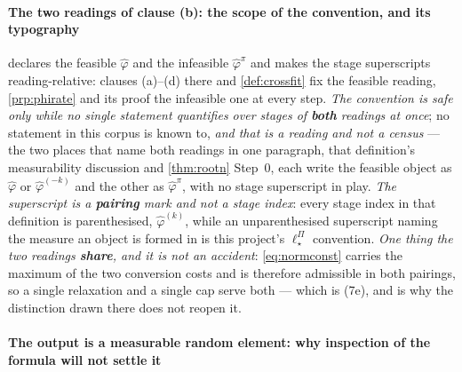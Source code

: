 \paragraph{The two readings of clause \textup{(b)}: the scope of the convention, and its typography}

 declares the feasible $\hat\varphi$ and the infeasible $\hat\varphi^{\pi}$ and makes
the stage superscripts reading-relative: clauses \textup{(a)}--\textup{(d)} there and
\cref{def:crossfit} fix the feasible reading, \cref{prp:phirate} and its proof the infeasible one at
every step. \emph{The convention is safe only while no single statement quantifies over stages of
\textbf{both} readings at once}; no statement in this corpus is known to, \emph{and that is a reading
and not a census} --- the two places that name both readings in one paragraph, that definition's
measurability discussion and \cref{thm:rootn} Step~0, each write the feasible object as $\hat\varphi$
or $\hat\varphi^{(-k)}$ and the other as $\hat\varphi^{\pi}$, with no stage superscript in play.
\emph{The superscript is a \textbf{pairing} mark and not a stage index}: every stage index in that
definition is parenthesised, $\hat\varphi^{(k)}$, while an unparenthesised superscript naming the
measure an object is formed in is this project's $\ell^{\Pi}_\star$ convention. \emph{One thing the two
readings \textbf{share}, and it is not an accident}: \eqref{eq:normconst} carries the maximum of the
two conversion costs and is therefore admissible in both pairings, so a single relaxation and a single
cap serve both --- which is \textup{(7e)}, and is why the distinction drawn
there does not reopen it.

\paragraph{The output is a measurable random element: why inspection of the formula will not settle it}

